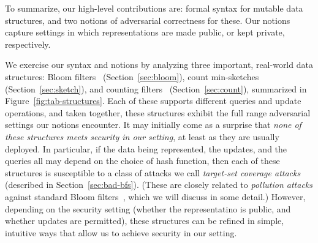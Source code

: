 
To summarize, our high-level contributions are: formal syntax for
mutable data structures, and two notions of adversarial
correctness for these.  Our notions capture settings in which representations
are made public, or kept private, respectively.

We exercise our syntax and notions by analyzing three important, real-world data
structures: Bloom filters~\cite{bloom1970space} (Section~\ref{sec:bloom}), count
min-sketches~\cite{cormode2005improved} (Section~\ref{sec:sketch}), and counting
filters~\cite{fan2000summary} (Section~\ref{sec:count}), summarized in
Figure~\ref{fig:tab-structures}. Each of these supports different queries and
update operations, and taken together, these structures exhibit the full range
adversarial settings our notions encounter. It may initially come as a surprise
that \emph{none of these structures meets security in our setting}, at least as
they are usually deployed. In particular, if the data being represented,
the updates, and the queries all may depend on the choice of hash function, then each of
these structures is susceptible to a class of attacks we call \emph{target-set
coverage attacks} (described in Section~\ref{sec:bad-bfs}). (These are closely
related to \emph{pollution attacks} against standard Bloom
filters~\cite{gerbet2015power}, which we will discuss in some detail.)
%
However, depending on the security setting (whether the representatino is
public, and whether updates are permitted), these structures can be refined in
simple, intuitive ways that allow us to achieve security in our setting.

